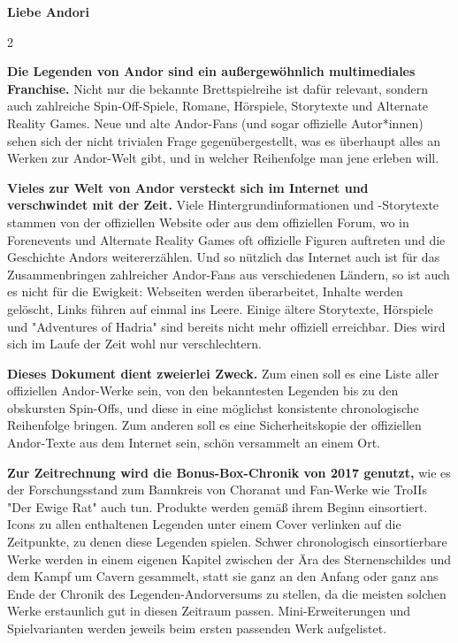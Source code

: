 \documentclass[10pt, a4paper, oneside]{book}
\begin{document}
\newpage









\thispagestyle{plain} %




\textbf{Liebe Andori}

\begin{multicols}{2}

\textbf{Die Legenden von Andor sind ein außergewöhnlich multimediales Franchise.} Nicht nur die bekannte Brettspielreihe ist dafür relevant, sondern auch zahlreiche Spin-Off-Spiele, Romane, Hörspiele, Storytexte und Alternate Reality Games. Neue und alte Andor-Fans (und sogar offizielle Autor*innen) sehen sich der nicht trivialen Frage gegenübergestellt, was es überhaupt alles an Werken zur Andor-Welt gibt, und in welcher Reihenfolge man jene erleben will.\bigskip

\textbf{Vieles zur Welt von Andor versteckt sich im Internet und verschwindet mit der Zeit.} Viele Hintergrundinformationen und -Storytexte stammen von der offiziellen Website oder aus dem offiziellen Forum, wo in Forenevents und Alternate Reality Games oft offizielle Figuren auftreten und die Geschichte Andors weitererzählen. Und so nützlich das Internet auch ist für das Zusammenbringen zahlreicher Andor-Fans aus verschiedenen Ländern, so ist auch es nicht für die Ewigkeit: Webseiten werden überarbeitet, Inhalte werden gelöscht, Links führen auf einmal ins Leere. Einige ältere Storytexte, Hörspiele und "Adventures of Hadria" sind bereits nicht mehr offiziell erreichbar. Dies wird sich im Laufe der Zeit wohl nur verschlechtern.\bigskip

\textbf{Dieses Dokument dient zweierlei Zweck.} 
Zum einen soll es eine Liste aller offiziellen Andor-Werke sein, von den bekanntesten Legenden bis zu den obskursten Spin-Offs, und diese in eine möglichst konsistente chronologische Reihenfolge bringen.
Zum anderen soll es eine Sicherheitskopie der offiziellen Andor-Texte aus dem Internet sein, schön versammelt an einem Ort.\bigskip

\textbf{Zur Zeitrechnung wird die Bonus-Box-Chronik von 2017 genutzt,} wie es der Forschungsstand zum Bannkreis von Choranat und Fan-Werke wie TroIIs "Der Ewige Rat" auch tun. Produkte werden gemäß ihrem Beginn einsortiert. Icons zu allen enthaltenen Legenden unter einem Cover verlinken auf die Zeitpunkte, zu denen diese Legenden spielen. Schwer chronologisch einsortierbare Werke werden in einem eigenen Kapitel zwischen der Ära des Sternenschildes und dem Kampf um Cavern gesammelt, statt sie ganz an den Anfang oder ganz ans Ende der Chronik des Legenden-Andorversums zu stellen, da die meisten solchen Werke erstaunlich gut in diesen Zeitraum passen. Mini-Erweiterungen und Spielvarianten werden jeweils beim ersten passenden Werk aufgelistet.\bigskip


\end{multicols}
\end{document}
